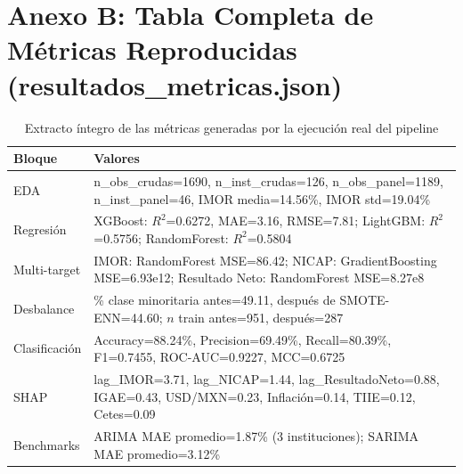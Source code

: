 \chapter*{Anexo B: Tabla Completa de Métricas Reproducidas (resultados\_metricas.json)}

\begin{table}[H]
\centering
\caption{Extracto íntegro de las métricas generadas por la ejecución real del pipeline}
\begin{tabularx}{\textwidth}{lX}
\toprule
\textbf{Bloque} & \textbf{Valores} \\
\midrule
EDA & n\_obs\_crudas=1690, n\_inst\_crudas=126, n\_obs\_panel=1189, n\_inst\_panel=46, IMOR media=14.56\%, IMOR std=19.04\% \\
Regresión & XGBoost: $R^2$=0.6272, MAE=3.16, RMSE=7.81; LightGBM: $R^2$=0.5756; RandomForest: $R^2$=0.5804 \\
Multi-target & IMOR: RandomForest MSE=86.42; NICAP: GradientBoosting MSE=6.93e12; Resultado Neto: RandomForest MSE=8.27e8 \\
Desbalance & \% clase minoritaria antes=49.11, después de SMOTE-ENN=44.60; $n$ train antes=951, después=287 \\
Clasificación & Accuracy=88.24\%, Precision=69.49\%, Recall=80.39\%, F1=0.7455, ROC-AUC=0.9227, MCC=0.6725 \\
SHAP & lag\_IMOR=3.71, lag\_NICAP=1.44, lag\_ResultadoNeto=0.88, IGAE=0.43, USD/MXN=0.23, Inflación=0.14, TIIE=0.12, Cetes=0.09 \\
Benchmarks & ARIMA MAE promedio=1.87\% (3 instituciones); SARIMA MAE promedio=3.12\% \\
\bottomrule
\end{tabularx}
\end{table}

